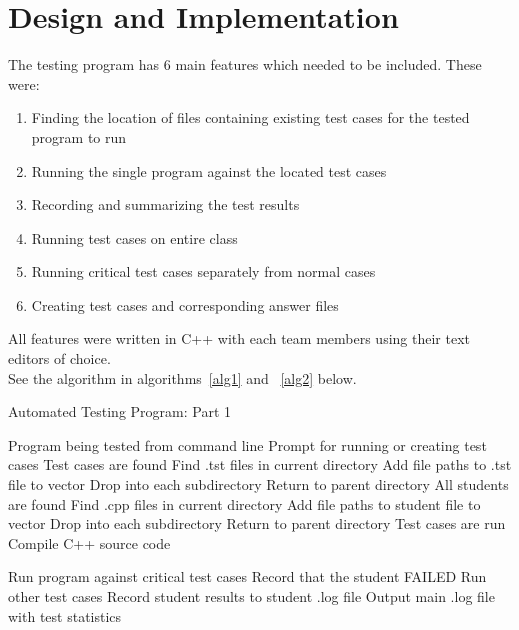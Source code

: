 \chapter{Design and Implementation}
The testing program has 6 main features which needed to be included.
These were:
\begin{enumerate}
	\item Finding the location of files containing existing test cases for the tested program to run
	\item Running the single program against the located test cases
	\item Recording and summarizing the test results
	\item Running test cases on entire class
	\item Running critical test cases separately from normal cases
	\item Creating test cases and corresponding answer files
\end{enumerate}
All features were written in C++ with each team members using their text
editors of choice.
\\ See the algorithm in algorithms~\ref{alg1} and ~\ref{alg2} below.
\begin{algorithm} [H] 
\caption{Automated Testing Program: Part 1}
\label{alg1}
\begin{algorithmic}    

\REQUIRE Program being tested from command line
\STATE Prompt for running or creating test cases
        \ENSURE Test cases are found
            \STATE Find .tst files in current directory
            \STATE Add file paths to .tst file to vector
            \STATE Drop into each subdirectory
        \ELSE
            \STATE Return to parent directory
        \ENDIF
        \ENSURE All students are found
            \STATE Find .cpp files in current directory
                \STATE Add file paths to student file to vector
            \ENDIF
            \STATE Drop into each subdirectory
        \ELSE
            \STATE Return to parent directory
        \ENDIF
        \ENSURE Test cases are run
        \STATE Compile C++ source code
        
                \STATE Run program against critical test cases
                    \STATE Record that the student FAILED
                \ELSE
                    \STATE Run other test cases
                \ENDIF
                \STATE Record student results to student .log file
            \ENDWHILE
        \ENDWHILE
        \STATE Output main .log file with test statistics
    \ENDIF
\end{algorithmic}
\end{algorithm}
